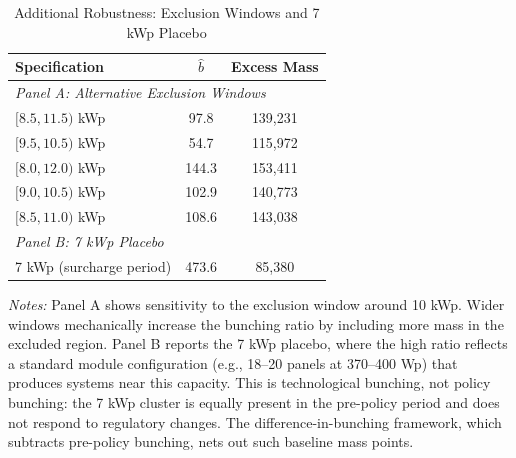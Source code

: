 \documentclass[12pt]{article}
\begin{document}
\begin{table}[h]
\centering
\caption{Additional Robustness: Exclusion Windows and 7 kWp Placebo}
\label{tab:app_robustness}
\begin{tabular}{lcc}
\toprule
Specification & $\hat{b}$ & Excess Mass \\
\midrule
\multicolumn{3}{l}{\textit{Panel A: Alternative Exclusion Windows}} \\
$[8.5, 11.5)$ kWp & 97.8 & 139,231 \\
$[9.5, 10.5)$ kWp & 54.7 & 115,972 \\
{}$[8.0, 12.0)$ kWp & 144.3 & 153,411 \\
{}$[9.0, 10.5)$ kWp & 102.9 & 140,773 \\
{}$[8.5, 11.0)$ kWp & 108.6 & 143,038 \\
\midrule
\multicolumn{3}{l}{\textit{Panel B: 7 kWp Placebo}} \\
7 kWp (surcharge period) & 473.6 & 85,380 \\
\bottomrule
\end{tabular}

\begin{flushleft}\small \textit{Notes:} Panel A shows sensitivity to the exclusion window around 10 kWp. Wider windows mechanically increase the bunching ratio by including more mass in the excluded region. Panel B reports the 7 kWp placebo, where the high ratio reflects a standard module configuration (e.g., 18--20 panels at 370--400 Wp) that produces systems near this capacity. This is technological bunching, not policy bunching: the 7 kWp cluster is equally present in the pre-policy period and does not respond to regulatory changes. The difference-in-bunching framework, which subtracts pre-policy bunching, nets out such baseline mass points.\end{flushleft}
\end{table}
\end{document}
